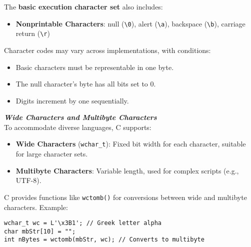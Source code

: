 The \textbf{basic execution character set} also includes:
\begin{itemize}
    \item \textbf{Nonprintable Characters}: null (\texttt{\textbackslash 0}), alert (\texttt{\textbackslash a}), backspace (\texttt{\textbackslash b}), carriage return (\texttt{\textbackslash r})
\end{itemize}
Character codes may vary across implementations, with conditions:

\begin{itemize}
    \item Basic characters must be representable in one byte.
    \item The null character's byte has all bits set to 0.
    \item Digits increment by one sequentially.
\end{itemize}
\textbf{\textit{Wide Characters and Multibyte Characters}} \\
To accommodate diverse languages, C supports:

\begin{itemize}
    \item \textbf{Wide Characters} (\texttt{wchar\_t}): Fixed bit width for each character, suitable for large character sets.
    \item \textbf{Multibyte Characters}: Variable length, used for complex scripts (e.g., UTF-8).
\end{itemize}

C provides functions like \texttt{wctomb()} for conversions between wide and multibyte characters. Example:
\begin{tcolorbox}
\begin{verbatim}
wchar_t wc = L'\x3B1'; // Greek letter alpha 
char mbStr[10] = "";
int nBytes = wctomb(mbStr, wc); // Converts to multibyte
\end{verbatim}
\end{tcolorbox}

